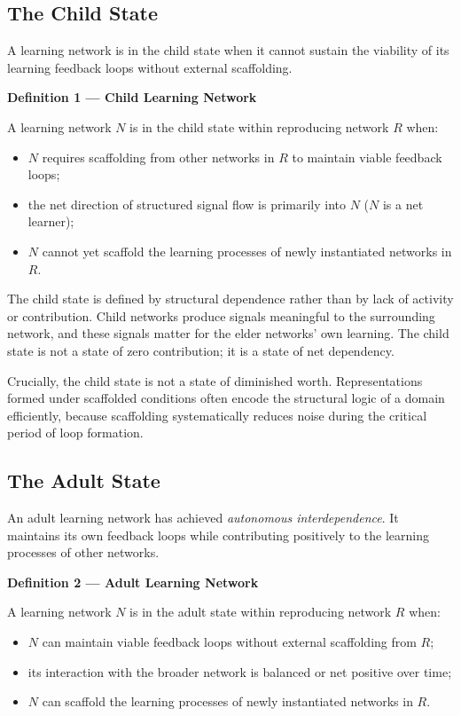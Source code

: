 \documentclass[11pt]{article}
\begin{document}
\subsection{The Child State}

A learning network is in the child state when it cannot sustain the viability of its learning
feedback loops without external scaffolding.

\begin{mdframed}
\textbf{Definition 1 --- Child Learning Network}

A learning network $N$ is in the child state within reproducing network $R$ when:
\begin{itemize}
    \item $N$ requires scaffolding from other networks in $R$ to maintain viable feedback loops;
    \item the net direction of structured signal flow is primarily into $N$ ($N$ is a net learner);
    \item $N$ cannot yet scaffold the learning processes of newly instantiated networks in $R$.
\end{itemize}
\end{mdframed}

The child state is defined by structural dependence rather than by lack of activity or
contribution. Child networks produce signals meaningful to the surrounding network, and these
signals matter for the elder networks' own learning. The child state is not a state of zero
contribution; it is a state of net dependency.

Crucially, the child state is not a state of diminished worth. Representations formed under
scaffolded conditions often encode the structural logic of a domain efficiently, because
scaffolding systematically reduces noise during the critical period of loop formation.

\subsection{The Adult State}

An adult learning network has achieved \emph{autonomous interdependence}. It maintains its own
feedback loops while contributing positively to the learning processes of other networks.

\begin{mdframed}
\textbf{Definition 2 --- Adult Learning Network}

A learning network $N$ is in the adult state within reproducing network $R$ when:
\begin{itemize}
    \item $N$ can maintain viable feedback loops without external scaffolding from $R$;
    \item its interaction with the broader network is balanced or net positive over time;
    \item $N$ can scaffold the learning processes of newly instantiated networks in $R$.
\end{itemize}
\end{mdframed}
\end{document}
